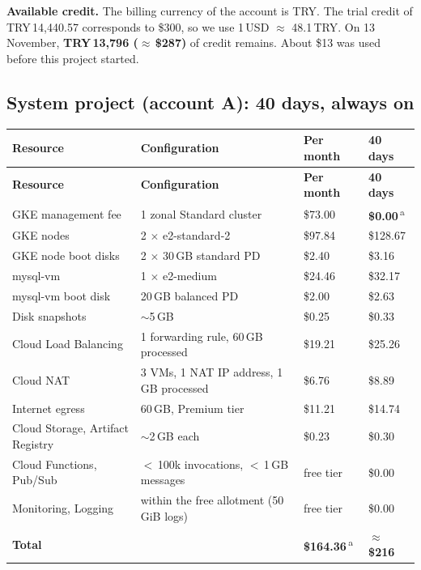 \documentclass[11pt,a4paper]{article}
\begin{document}
\textbf{Available credit.} The billing currency of the account is TRY. The
trial credit of TRY\,14{,}440.57 corresponds to \$300, so we use
1\,USD $\approx$ 48.1\,TRY. On 13 November, \textbf{TRY\,13{,}796
($\approx$\,\$287)} of credit remains. About \$13 was used before this
project started.

\subsection{System project (account A): 40 days, always on}

{\small
\begin{longtable}{L{3.5cm}L{4.6cm}L{3.0cm}L{3.0cm}}
\toprule
\textbf{Resource} & \textbf{Configuration} & \textbf{Per month} & \textbf{40 days} \\
\midrule
\endfirsthead
\toprule
\textbf{Resource} & \textbf{Configuration} & \textbf{Per month} & \textbf{40 days} \\
\midrule
\endhead
GKE management fee & 1 zonal Standard cluster & \$73.00 &
  \textbf{\$0.00}\,\textsuperscript{a} \\
GKE nodes & 2 $\times$ e2-standard-2 & \$97.84 & \$128.67 \\
GKE node boot disks & 2 $\times$ 30\,GB standard PD & \$2.40 & \$3.16 \\
mysql-vm & 1 $\times$ e2-medium & \$24.46 & \$32.17 \\
mysql-vm boot disk & 20\,GB balanced PD & \$2.00 & \$2.63 \\
Disk snapshots & $\sim$5\,GB & \$0.25 & \$0.33 \\
Cloud Load Balancing & 1 forwarding rule, 60\,GB processed & \$19.21 & \$25.26 \\
Cloud NAT & 3 VMs, 1 NAT IP address, 1\,GB processed & \$6.76 & \$8.89 \\
Internet egress & 60\,GB, Premium tier & \$11.21 & \$14.74 \\
Cloud Storage, Artifact Registry & $\sim$2\,GB each & \$0.23 & \$0.30 \\
Cloud Functions, Pub/Sub & $<$\,100k invocations, $<$\,1\,GB messages & free tier & \$0.00 \\
Monitoring, Logging & within the free allotment (50\,GiB logs) & free tier & \$0.00 \\
\midrule
\textbf{Total} & & \textbf{\$164.36}\,\textsuperscript{a} & \textbf{$\approx$\,\$216} \\
\bottomrule
\end{longtable}
}
\end{document}
